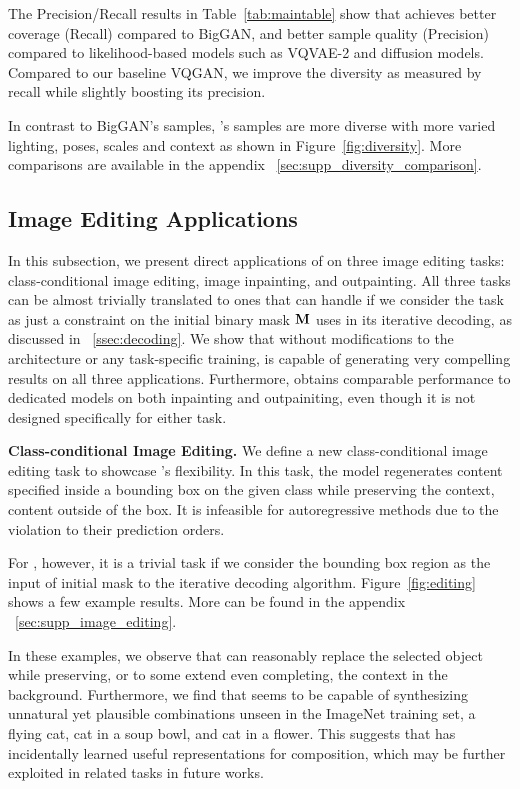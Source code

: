 The Precision/Recall results in Table~\ref{tab:maintable} show that \model achieves better coverage (Recall) compared to BigGAN, and better sample quality (Precision) compared to likelihood-based models such as VQVAE-2 and diffusion models. Compared to our baseline VQGAN, we improve the diversity as measured by recall while slightly boosting its precision. 

In contrast to BigGAN’s samples, \model's samples are more diverse with more varied lighting, poses, scales and context as shown in Figure~\ref{fig:diversity}. More comparisons are available in the appendix ~\ref{sec:supp_diversity_comparison}.

\subsection{Image Editing Applications}
\label{ssec:applications}
In this subsection, we present direct applications of \model on three image editing tasks: class-conditional image editing, image inpainting, and outpainting. All three tasks can be almost trivially translated to ones that \model can handle if we consider the task as just a constraint on the initial binary mask ${\mathbf{M}}$ \model uses in its iterative decoding, as discussed in ~\ref{ssec:decoding}. We show that without modifications to the architecture or any task-specific training, \model is capable of generating very compelling results on all three applications. Furthermore, \model obtains comparable performance to dedicated models on both inpainting and outpainiting, even though it is not designed specifically for either task.

\noindent\textbf{Class-conditional Image Editing.}
We define a new class-conditional image editing task to showcase \model's flexibility. In this task, the model regenerates content specified inside a bounding box on the given class while preserving the context, \ie content outside of the box. It is infeasible for autoregressive methods due to the violation to their prediction orders.

For \model, however, it is a trivial task if we consider the bounding box region as the input of initial mask to the iterative decoding algorithm. Figure~\ref{fig:editing} shows a few example results. More can be found in the appendix ~\ref{sec:supp_image_editing}.

In these examples, we observe that \model can reasonably replace the selected object while preserving, or to some extend even completing, the context in the background. Furthermore, we find that \model seems to be capable of synthesizing unnatural yet plausible combinations unseen in the ImageNet training set, \eg a flying cat, cat in a soup bowl, and cat in a flower. This suggests that \model has incidentally learned useful representations for composition, which may be further exploited in related tasks in future works.

